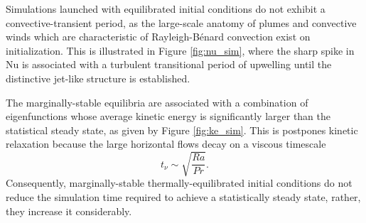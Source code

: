 \documentclass[reprint,amsmath,amssymb,aps]{revtex4-1}
\newcommand\Nu{\mathrm{Nu}}
\begin{document}
Simulations launched with equilibrated initial conditions do not exhibit a convective-transient period, as the large-scale anatomy of plumes and convective winds which are characteristic of Rayleigh-B\'enard convection exist on initialization. 
This is illustrated in Figure \ref{fig:nu_sim}, where the sharp spike in $\Nu$ is associated with a turbulent transitional period of upwelling until the distinctive jet-like structure is established. 
\par The marginally-stable equilibria are associated with a combination of eigenfunctions whose average kinetic energy is significantly larger than the statistical steady state, as given by Figure \ref{fig:ke_sim}. 
This is postpones kinetic relaxation because the large horizontal flows decay on a viscous timescale
\begin{equation}
    t_{\nu} \sim \sqrt{\frac{Ra}{Pr}}. \nonumber
\end{equation}
Consequently, marginally-stable thermally-equilibrated initial conditions do not reduce the simulation time required to achieve a statistically steady state, rather, they increase it considerably.
\end{document}
